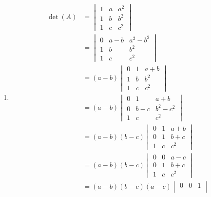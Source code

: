 \documentclass{article}
\numberwithin{equation}{section}
\begin{document}
\begin{eg}
\begin{enumerate}
        \item
        \begin{align*}
            \det(A) &= \begin{vmatrix}
                1 & a & a^2 \\
                1 & b & b^2 \\
                1 & c & c^2
            \end{vmatrix} \\[15pt]
            &= \begin{vmatrix}
                0 & a - b & a^2 - b^2\\
                1 & b & b^2 \\
                1 & c & c^2
            \end{vmatrix} \tag{row $1$ $\rightarrow$ row $1$ - row $2$} \\[15pt]
            &= (a - b)\begin{vmatrix}
                0 & 1 & a + b \\
                1 & b & b^2 \\
                1 & c & c^2
            \end{vmatrix} \tag{factor}\\[15pt]
            &= (a - b)\begin{vmatrix}
                0 & 1 & a + b \\
                0 & b - c & b^2 - c^2 \\
                1 & c & c^2
            \end{vmatrix} \tag{row $2$ $\rightarrow$ row $2$ - row $3$} \\[15pt]
            &= (a - b)(b - c)\begin{vmatrix}
                0 & 1 & a + b \\
                0 & 1 & b + c \\
                1 & c & c^2
            \end{vmatrix} \tag{factor}\\[15pt]
            &= (a - b)(b - c)\begin{vmatrix}
                0 & 0 & a - c \\
                0 & 1 & b + c \\
                1 & c & c^2
            \end{vmatrix} \tag{row $1$ $\rightarrow$ row $1$ - row $2$} \\[15pt]
            &= (a - b)(b - c)(a - c)\begin{vmatrix}
                0 & 0 & 1 \\

\end{vmatrix}
\end{align*}
\end{enumerate}
\end{eg}
\end{document}
